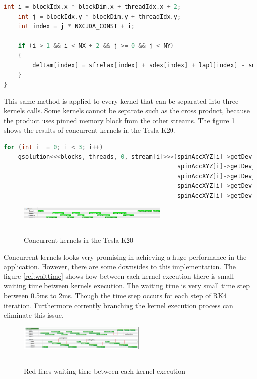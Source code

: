 \begin{lstlisting}[language=C++, label={lst:consingle}, caption={Evaluation of individual coordinates of the Zhang and Li model}]
    int i = blockIdx.x * blockDim.x + threadIdx.x + 2;
    int j = blockIdx.y * blockDim.y + threadIdx.y;
    int index = j * NXCUDA_CONST + i;

    if (i > 1 && i < NX + 2 && j >= 0 && j < NY)
    {
        deltam[index] = sfrelax[index] + sdex[index] + lapl[index] - sm[index];
    }
}
\end{lstlisting}

This same method is applied to every kernel that can be separated into three kernels calls. Some kernels cannot be separate such as the cross product, because the product uses pinned memory block from the other streams.  The figure \ref{fig:concurrent} shows the results of concurrent kernels in the Tesla K20.
\begin{lstlisting}[language=C++, caption={Evaluate Zhang and Li model}]
for (int i  = 0; i < 3; i++)
	gsolution<<<blocks, threads, 0, stream[i]>>>(spinAccXYZ[i]->getDev_deltam(),
												 spinAccXYZ[i]->getDev_sfrelax(), 
												 spinAccXYZ[i]->getDev_sm(), 
											 	 spinAccXYZ[i]->getDev_sdex(),
											 	 spinAccXYZ[i]->getDev_lapl());
\end{lstlisting}

\begin{figure}[htbp]
	\centering
		\includegraphics[width=0.65\textwidth]{Figures/concurent.png}
		\rule{35em}{0.2pt}
	\caption[Streams kernels Tesla K20]{Concurrent kernels in the Tesla K20
}
	\label{fig:concurrent}
\end{figure}

Concurrent kernels  looks very promising in achieving a huge performance in the application. However, there are some downsides to this implementation. The figure \ref{ref:waittime} shows how between each kernel execution there is small waiting time between kernels execution. The waiting time is very small time step between 0.5ms to 2ms. Though the time step occurs for each step of RK4 iteration. Furthermore corrently branching the kernel execution process can eliminate this issue.

\begin{figure}[htbp]
	\centering
		\includegraphics[width=0.55\textwidth]{Figures/waittime.png}
		\rule{35em}{0.2pt}
	\caption[Waiting time concurrent kernels]{Red lines waiting time between each kernel execution
}
	\label{fig:waittime}
\end{figure}


